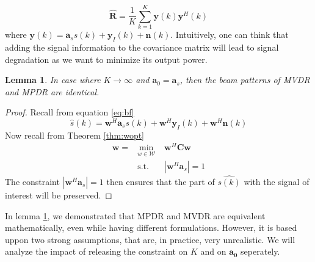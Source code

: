 \documentclass[12pt]{article}
\newtheorem{lemma}{Lemma}
\begin{document}
\begin{equation}\label{eq:chat}
    \hat{\mathbf{R}} = \frac{1}{K}\sum_{k=1}^K \mathbf{y}(k)\mathbf{y}^H(k)
\end{equation}
where $\mathbf{y}(k) = \mathbf{a}_ss(k) + \mathbf{y}_I(k)+\mathbf{n}(k)$. Intuitively, one can think that adding the signal information to the covariance matrix will lead to signal degradation as we want to minimize its output power. 
\begin{lemma}\label{lem:mpdr}
    In case where $K\rightarrow\infty$ and $\mathbf{a}_0 = \mathbf{a}_s$, then the beam patterns of MVDR and MPDR are identical.
\end{lemma}
\begin{proof}
    Recall from equation \ref{eq:bf}
    \begin{equation*}
        \hat{s}(k)=\mathbf{w}^H\mathbf{a}_ss(k) + \mathbf{w}^H\mathbf{y}_I(k) + \mathbf{w}^H\mathbf{n}(k)
    \end{equation*}
    Now recall from Theorem \ref{thm:wopt} 
    $$\begin{aligned}
    \mathbf{w} =& \min_{w\in\mathcal{W}} &\mathbf{w}^H\mathbf{C}\mathbf{w}\\
    & \textrm{s.t.} \quad &|\mathbf{w}^H\mathbf{a}_s| = 1
\end{aligned}$$
    The constraint $|\mathbf{w}^H\mathbf{a}_s| = 1$ then ensures that the part of $\hat{s(k)}$ with the signal of interest will be preserved.
\end{proof}
In lemma \ref{lem:mpdr}, we demonstrated that MPDR and MVDR are equivalent mathematically, even while having different formulations. However, it is based uppon two strong assumptions, that are, in practice, very unrealistic. We will analyze the impact of releasing the constraint on $K$ and on $\mathbf{a_0}$ seperately.
\end{document}
